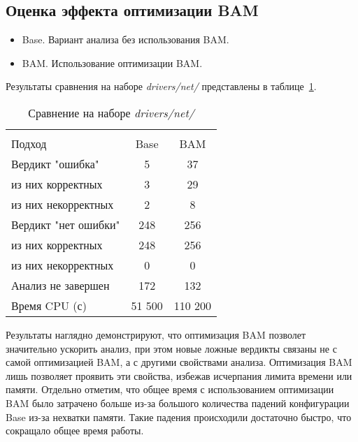 \subsection{Оценка эффекта оптимизации BAM}

\begin{itemize}
\item Base. Вариант анализа без использования BAM.
\item BAM. Использование оптимизации BAM.
\end{itemize}

Результаты сравнения на наборе \textit{drivers/net/} представлены в таблице~\ref{table-drivers-bam}.

  \begin{table}[h]\footnotesize \centering
    \caption{Сравнение на наборе \textit{drivers/net/}}
  	\label{table-drivers-bam}
    \begin{tabular}{ | l | c | c | }
      \hline
      		& 		\multicolumn{2}{c|}{\combatmode}  \\
      Подход         				& Base  	& BAM 	\\ \hline
      Вердикт "ошибка" 				& 5   		& 37    \\ 
  \hspace{0.5cm} из них корректных 	& 3 		& 29 	\\ 
  \hspace{0.5cm} из них некорректных & 2		& 8 	\\ \hline
      Вердикт "нет ошибки"  		& 248    	& 256    \\ 
  \hspace{0.5cm} из них корректных 	& 248 		& 256    \\
  \hspace{0.5cm} из них некорректных & 0 		& 0    	\\ \hline
      Анализ не завершен       		& 172    	& 132    \\ \hline
      Время CPU (с)   				& 51 500 	& 110 200 \\ 
      \hline
    \end{tabular}
  \end{table}

Результаты наглядно демонстрируют, что оптимизация BAM позволет значительно ускорить анализ, при этом новые ложные вердикты связаны не с самой оптимизацией BAM, а с другими свойствами анализа.
Оптимизация BAM лишь позволяет проявить эти свойства, избежав исчерпания лимита времени или памяти.
Отдельно отметим, что общее время с использованием оптимизации BAM было затрачено больше из-за большого количества падений конфигурации Base из-за нехватки памяти. 
Такие падения происходили достаточно быстро, что сокращало общее время работы.

